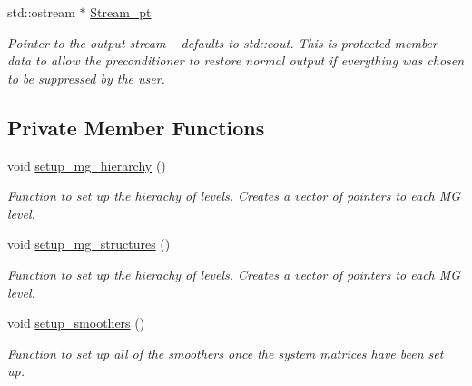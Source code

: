 \begin{DoxyCompactItemize}
std\+::ostream $\ast$ \hyperlink{classoomph_1_1MGSolver_a5184053b6d2a717a6d6865c76acef14b}{Stream\+\_\+pt}
\begin{DoxyCompactList}\small\item\em Pointer to the output stream -- defaults to std\+::cout. This is protected member data to allow the preconditioner to restore normal output if everything was chosen to be suppressed by the user. \end{DoxyCompactList}\end{DoxyCompactItemize}
\subsection*{Private Member Functions}
\begin{DoxyCompactItemize}
\item 
void \hyperlink{classoomph_1_1MGSolver_a8b25ea9a7781f95ddf46b4b8d427d3d0}{setup\+\_\+mg\+\_\+hierarchy} ()
\begin{DoxyCompactList}\small\item\em Function to set up the hierachy of levels. Creates a vector of pointers to each MG level. \end{DoxyCompactList}\item 
void \hyperlink{classoomph_1_1MGSolver_a24b2cc3ce0eefde4eef0b80b38339b38}{setup\+\_\+mg\+\_\+structures} ()
\begin{DoxyCompactList}\small\item\em Function to set up the hierachy of levels. Creates a vector of pointers to each MG level. \end{DoxyCompactList}\item 
void \hyperlink{classoomph_1_1MGSolver_a9b3674f92da65b8cacada47325107804}{setup\+\_\+smoothers} ()
\begin{DoxyCompactList}\small\item\em Function to set up all of the smoothers once the system matrices have been set up. \end{DoxyCompactList}\end{DoxyCompactItemize}

